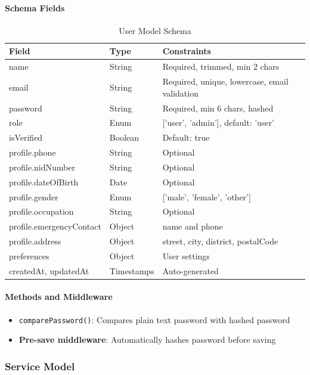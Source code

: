\documentclass[12pt,a4paper]{article}
\newcommand{\code}[1]{\texttt{#1}}
\begin{document}
\paragraph{Schema Fields}
\begin{table}[H]
\centering
\small
\begin{tabular}{@{}lll@{}}
\toprule
\textbf{Field} & \textbf{Type} & \textbf{Constraints} \\
\midrule
name & String & Required, trimmed, min 2 chars \\
email & String & Required, unique, lowercase, email validation \\
password & String & Required, min 6 chars, hashed \\
role & Enum & ['user', 'admin'], default: 'user' \\
isVerified & Boolean & Default: true \\
profile.phone & String & Optional \\
profile.nidNumber & String & Optional \\
profile.dateOfBirth & Date & Optional \\
profile.gender & Enum & ['male', 'female', 'other'] \\
profile.occupation & String & Optional \\
profile.emergencyContact & Object & name and phone \\
profile.address & Object & street, city, district, postalCode \\
preferences & Object & User settings \\
createdAt, updatedAt & Timestamps & Auto-generated \\
\bottomrule
\end{tabular}
\caption{User Model Schema}
\label{tab:user-schema}
\end{table}

\paragraph{Methods and Middleware}
\begin{itemize}
\item \code{comparePassword()}: Compares plain text password with hashed password
\item \textbf{Pre-save middleware}: Automatically hashes password before saving
\end{itemize}

\subsubsection{Service Model}
\label{subsubsec:service-model}
\end{document}
